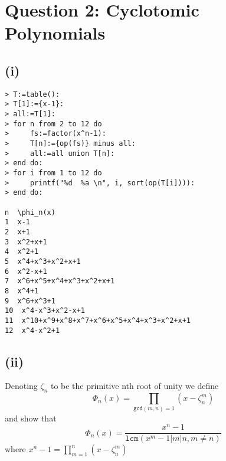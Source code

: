 \documentclass[10pt]{report}
\newcommand{\brac}[1]{\left( #1 \right)}
\newcommand{\lcm}[1]{\texttt{lcm}\brac{#1}}
\renewcommand{\gcd}[1]{\texttt{gcd}\brac{#1}}
\begin{document}
\newpage
\section*{Question 2: Cyclotomic Polynomials}

\subsection*{(i)}

\begin{verbatim}
> T:=table():
> T[1]:={x-1}:
> all:=T[1]:
> for n from 2 to 12 do
>     fs:=factor(x^n-1):
>     T[n]:={op(fs)} minus all:
>     all:=all union T[n]:
> end do:
> for i from 1 to 12 do
>     printf("%d  %a \n", i, sort(op(T[i]))):
> end do: 

n  \phi_n(x)
1  x-1 
2  x+1 
3  x^2+x+1 
4  x^2+1 
5  x^4+x^3+x^2+x+1 
6  x^2-x+1 
7  x^6+x^5+x^4+x^3+x^2+x+1 
8  x^4+1 
9  x^6+x^3+1 
10  x^4-x^3+x^2-x+1 
11  x^10+x^9+x^8+x^7+x^6+x^5+x^4+x^3+x^2+x+1 
12  x^4-x^2+1 
\end{verbatim}

\subsection*{(ii)}

Denoting $\zeta_n$ to be the primitive nth root of unity we define $$\Phi_n(x) = \prod_{\gcd{m,n}=1} (x-\zeta_n^m)$$ and show that
$$\Phi_n(x) = \frac {x^n-1} {\lcm{x^m-1\Big | m|n,m\neq n}}$$  where $x^n-1 = \prod_{m=1}^n (x-\zeta_n^m) $
\end{document}
